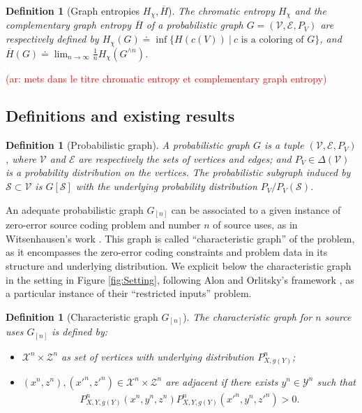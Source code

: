 \documentclass[conference,a4paper]{IEEEtran}
\newtheorem{definition}[theorem]{Definition}
\def\ar#1{\textcolor{red}{\footnotesize {(ar: #1)}}}
\begin{document}
\iffalse
\begin{definition}[Graph entropies $H_\chi, \overline{H}$] The chromatic entropy $H_\chi$ and the complementary graph entropy $\overline{H}$ of a probabilistic graph $G = (\mathcal{V}, \mathcal{E}, P_V)$ are respectively defined by $H_{\chi}(G) \doteq \inf \lbrace H(c(V)) \:|\: c \text{ is a coloring of } G \rbrace$, and $\overline{H}(G) \doteq \lim_{n \rightarrow \infty} \frac{1}{n} H_{\chi}(G^{\wedge n})$.

\end{definition} \ar{mets dans le titre chromatic entropy et complementary graph entropy}

\subsection{Definitions and existing results}

\begin{definition}[Probabilistic graph]
A probabilistic graph $G$ is a tuple $(\mathcal{V}, \mathcal{E}, P_V)$, where $\mathcal{V}$ and $\mathcal{E}$ are respectively the sets of vertices and edges; and $P_V \in \Delta(\mathcal{V})$ is a probability distribution on the vertices. The probabilistic subgraph induced by $\mathcal{S} \subset \mathcal{V}$ is $G[\mathcal{S}]$ with the underlying probability distribution $P_V/P_V(\mathcal{S})$.
\end{definition}

An adequate probabilistic graph $G_{[n]}$ can be associated to a given instance of zero-error source coding problem and number $n$ of source uses, as in Witsenhausen's work \cite{witsenhausen1976zero}. This graph is called ``characteristic graph'' of the problem, as it encompasses the zero-error coding constraints and problem data in its structure and underlying distribution. We explicit below the characteristic graph in the setting in Figure \ref{fig:Setting}, following Alon and Orlitsky's framework \cite{alon1996source}, as a particular instance of their ``restricted inputs'' problem.

\begin{definition}[Characteristic graph $G_{[n]}$]
    The characteristic graph for $n$ source uses $G_{[n]}$ is defined by:
    \begin{itemize}
        \item $\mathcal{X}^n \times \mathcal{Z}^n$ as set of vertices with underlying distribution $P^n_{X,g(Y)}$;
        \item $(x^n, z^n), (x'^n,z'^n) \in \mathcal{X}^n \times \mathcal{Z}^n$ are adjacent if there exists $y^n \in \mathcal{Y}^n$ such that 
        \begin{align}
            P^n_{X,Y,g(Y)}(x^n, y^n,z^n)P^n_{X,Y,g(Y)}(x'^n,y^n,z'^n) > 0. \label{eq:adjacentGn}
        \end{align}
    \end{itemize}
\end{definition}
\end{document}
